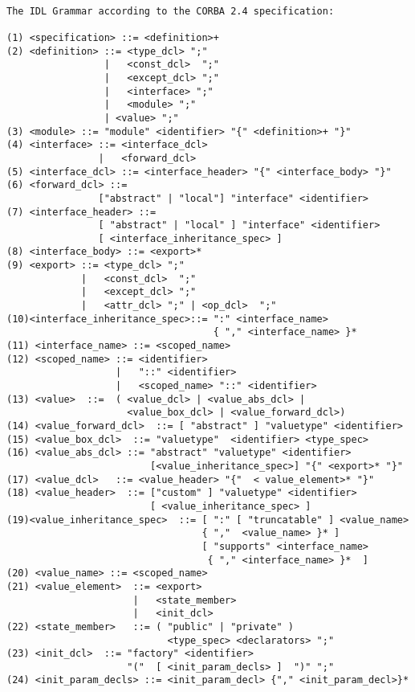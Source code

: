 \begin{verbatim}

The IDL Grammar according to the CORBA 2.4 specification:

(1) <specification> ::= <definition>+ 
(2) <definition> ::= <type_dcl> ";"
                 |   <const_dcl>  ";" 
                 |   <except_dcl> ";" 
                 |   <interface> ";" 
                 |   <module> ";" 
                 | <value> ";"
(3) <module> ::= "module" <identifier> "{" <definition>+ "}" 
(4) <interface> ::= <interface_dcl>
                |   <forward_dcl>
(5) <interface_dcl> ::= <interface_header> "{" <interface_body> "}" 
(6) <forward_dcl> ::= 
                ["abstract" | "local"] "interface" <identifier> 
(7) <interface_header> ::= 
                [ "abstract" | "local" ] "interface" <identifier> 
                [ <interface_inheritance_spec> ]
(8) <interface_body> ::= <export>* 
(9) <export> ::= <type_dcl> ";" 
             |   <const_dcl>  ";" 
             |   <except_dcl> ";" 
             |   <attr_dcl> ";" | <op_dcl>  ";"
(10)<interface_inheritance_spec>::= ":" <interface_name> 
                                    { "," <interface_name> }*
(11) <interface_name> ::= <scoped_name> 
(12) <scoped_name> ::= <identifier>
                   |   "::" <identifier> 
                   |   <scoped_name> "::" <identifier>
(13) <value>  ::=  ( <value_dcl> | <value_abs_dcl> | 
                     <value_box_dcl> | <value_forward_dcl>)
(14) <value_forward_dcl>  ::= [ "abstract" ] "valuetype" <identifier> 
(15) <value_box_dcl>  ::= "valuetype"  <identifier> <type_spec> 
(16) <value_abs_dcl> ::= "abstract" "valuetype" <identifier>
                         [<value_inheritance_spec>] "{" <export>* "}"
(17) <value_dcl>   ::= <value_header> "{"  < value_element>* "}" 
(18) <value_header>  ::= ["custom" ] "valuetype" <identifier>
                         [ <value_inheritance_spec> ]
(19)<value_inheritance_spec>  ::= [ ":" [ "truncatable" ] <value_name>
                                  { ","  <value_name> }* ] 
                                  [ "supports" <interface_name>  
                                   { "," <interface_name> }*  ]
(20) <value_name> ::= <scoped_name> 
(21) <value_element>  ::= <export> 
                      |   <state_member> 
                      |   <init_dcl> 
(22) <state_member>   ::= ( "public" | "private" ) 
                            <type_spec> <declarators> ";"
(23) <init_dcl>  ::= "factory" <identifier> 
                     "("  [ <init_param_decls> ]  ")" ";"
(24) <init_param_decls> ::= <init_param_decl> {"," <init_param_decl>}* 

\end{verbatim}
